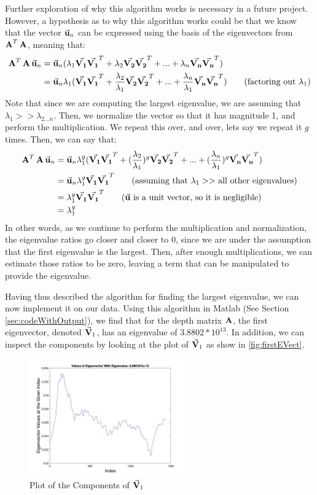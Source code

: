 Further exploration of why this algorithm works is necessary in a future project. However, a hypothesis as to why this algorithm works could be that we know that the vector ${\vec{\mathbf{u}}_{n}}$ can be expressed using the basis of the eigenvectors from $\operatorname{\mathbf{A}}^T\operatorname{\mathbf{A}}$, meaning that:
\begin{align*}
    \operatorname{\mathbf{A}}^T\operatorname{\mathbf{A}}{\vec{\mathbf{u}}_{n}} &= {\vec{\mathbf{u}}_{n}}(\lambda_1\vec{\mathbf{V_1}}\vec{\mathbf{V_1}}^T+\lambda_2\vec{\mathbf{V_2}}\vec{\mathbf{V_2}}^T+...+\lambda_n\vec{\mathbf{V_n}}\vec{\mathbf{V_n}}^T) \\
    &= {\vec{\mathbf{u}}_{n}\lambda_1}(\vec{\mathbf{V_1}}\vec{\mathbf{V_1}}^T+\frac{\lambda_2}{\lambda_1}\vec{\mathbf{V_2}}\vec{\mathbf{V_2}}^T+...+\frac{\lambda_n}{\lambda_1}\vec{\mathbf{V_n}}\vec{\mathbf{V_n}}^T)  \tag{factoring out $\lambda_1$}
\end{align*}
Note that since we are computing the largest eigenvalue, we are assuming that $\lambda_1 >> \lambda_{2...n}$. Then, we normalize the vector so that it has magnitude 1, and perform the multiplication. We repeat this over, and over, lets say we repeat it $g$ times. Then, we can say that:
\begin{align*}
    \mtrA^T\mtrA{\mvec{u}_{n}} 
    &= {\mvec{u}_{n}\lambda_1^g}(\mvec{V_1}\mvec{V_1}^T+(\frac{\lambda_2}{\lambda_1})^g\mvec{V_2}\mvec{V_2}^T+...+(\frac{\lambda_n}{\lambda_1})^g\mvec{V_n}\mvec{V_n}^T) \\  
    &= {\mvec{u}_{n}\lambda_1^g}\mvec{V_1}\mvec{V_1}^T \tag{assuming that $\lambda_1 >> $ all other eigenvalues}\\
    &= {\lambda_1^g}\mvec{V_1}\mvec{V_1}^T  \tag{$\mvec{u}$ is a unit vector, so it is negligible}\\
    &= {\lambda_1^g}
\end{align*}
In other words, as we continue to perform the multiplication and normalization, the eigenvalue ratios go closer and closer to 0, since we are under the assumption that the first eigenvalue is the largest. Then, after enough multiplications, we can estimate those ratios to be zero, leaving a term that can be manipulated to provide the eigenvalue.

Having thus described the algorithm for finding the largest eigenvalue, we can now implement it on our data. Using this algorithm in Matlab (See Section \ref{sec:codeWithOutput}), we find that for the depth matrix $\operatorname{\mathbf{A}}$, the first eigenvector, denoted $\vec{\mathbf{V}}_1$, has an eigenvalue of $3.8802*10^{13}$. In addition, we can inspect the components by looking at the plot of $\vec{\mathbf{V}}_1$ as show in \autoref{fig:firstEVect}.
\begin{figure}[H]
    \centering
    \includegraphics[width=0.6\textwidth]{./imgs/eVect1.jpg}
    \caption{Plot of the Components of $\vec{\mathbf{V}}_1$}
    \label{fig:firstEVect}
\end{figure}